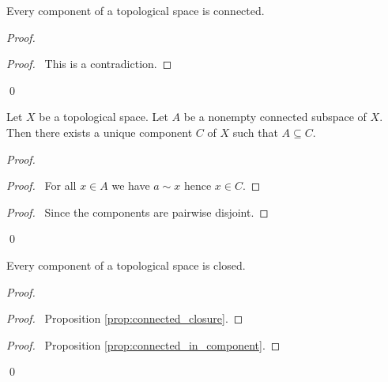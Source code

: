 \begin{prop}
Every component of a topological space is connected.
\end{prop}

\begin{proof}
\pf
{}
\qedstep
\begin{proof}
	\pf\ This is a contradiction.
\end{proof}
\qed
\end{proof}

\begin{prop}
\label{prop:connected_in_component}
Let $X$ be a topological space. Let $A$ be a nonempty connected subspace of $X$. Then there exists a unique component $C$ of $X$ such that $A \subseteq C$.
\end{prop}

\begin{proof}
\pf
{}
\begin{proof}
	\pf\ For all $x \in A$ we have $a \sim x$ hence $x \in C$.
\end{proof}
\begin{proof}
	\pf\ Since the components are pairwise disjoint.
\end{proof}
\qed
\end{proof}

\begin{prop}
Every component of a topological space is closed.
\end{prop}

\begin{proof}
\pf
{}
\begin{proof}
	\pf\ Proposition \ref{prop:connected_closure}.
\end{proof}
\begin{proof}
	\pf\ Proposition \ref{prop:connected_in_component}.
\end{proof}
\qed
\end{proof}

